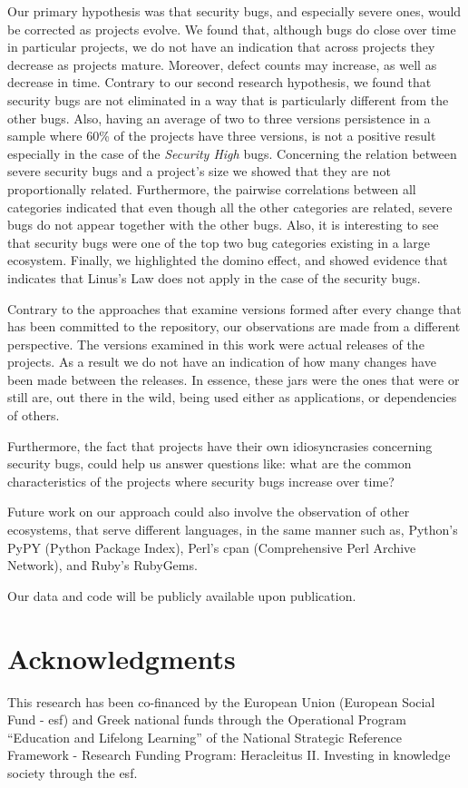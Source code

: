 \documentclass{sig-alternate}
\begin{document}
Our primary hypothesis was that security bugs, and especially severe
ones, would be corrected as projects evolve. We found that, although
bugs do close over time in particular projects, we do not have an indication that across
projects they decrease as projects mature. Moreover, defect counts may
increase, as well as decrease in time. Contrary to our second research hypothesis,
we found that security
bugs are not eliminated in a way that is particularly different from the other bugs.
Also, having an average of two to three versions persistence in a sample where 60\%
of the projects have three versions, is not a positive result especially in the
case of the {\it Security High} bugs. Concerning the relation between
severe security bugs and a project's size
we showed that they are not proportionally related. Furthermore, the
pairwise correlations between all categories indicated that even though all the other
categories are related, severe bugs do not appear together with the other bugs.
Also, it is interesting to see that security bugs were one of the top two
bug categories existing in a large ecosystem. Finally, we highlighted the
domino effect, and showed evidence that indicates that Linus's Law does not
apply in the case of the security bugs.

Contrary to the approaches that examine versions
formed after every change that has been committed to the repository,
our observations are made from a different perspective.
The versions examined in this work were actual releases
of the projects. As a result we do not have an indication of how many changes
have been made between the releases.
In essence, these {\sc jar}s were the ones that were or still are,
out there in the wild, being used either as applications,
or dependencies of others.

Furthermore, the fact that projects have their own idiosyncrasies concerning
security bugs, could help us answer questions like: what are the common
characteristics of the projects where security bugs increase over time?

Future work on our approach could also involve the observation of
other ecosystems, that serve different languages, in the same manner
such as, Python's PyPY (Python Package Index), Perl's {\sc cpan}
(Comprehensive Perl Archive Network), and Ruby's
RubyGems.

Our data and code will be publicly available upon publication.

\section{Acknowledgments}
This research has been co-financed by the European Union (European Social Fund
- {\sc esf}) and Greek national funds through the Operational Program
``Education and Lifelong Learning'' of the National Strategic Reference Framework -
Research Funding Program: Heracleitus II. Investing in knowledge society
through the {\sc esf}.
\end{document}

